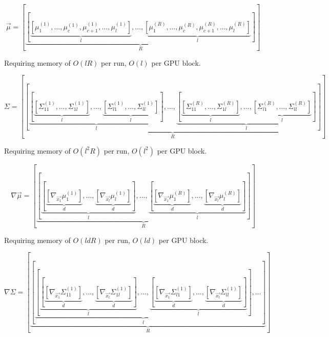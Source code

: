 \documentclass[index]{subfiles}
\begin{document}
\begin{equation}
    \vec{\mu} = \left[ \underbrace{\left[ \underbrace{\left[\mu_{1}^{(1)}, \ldots, \mu_{c}^{(1)}, \mu_{c+1}^{(1)}, \ldots, \mu_{l}^{(1)} \right]}_{l}, \ldots, \underbrace{\left[\mu_{1}^{(R)}, \ldots, \mu_{c}^{(R)}, \mu_{c+1}^{(R)}, \ldots, \mu_{l}^{(R)} \right]}_{l} \right]}_{R} \right]
\end{equation}

Requiring memory of $O(lR)$ per run, $O(l)$ per GPU block.

\begin{equation}
    \Sigma = \left[ \underbrace{ \left[ \underbrace{ \left[ \underbrace{ \left[ \Sigma_{11}^{(1)}, \ldots, \Sigma_{1l}^{(1)} \right]}_{l}, \ldots, \underbrace{ \left[ \Sigma_{l1}^{(1)}, \ldots, \Sigma_{ll}^{(1)} \right]}_{l} \right] }_{l}, \ldots, \underbrace{ \left[ \underbrace{ \left[ \Sigma_{11}^{(R)}, \ldots, \Sigma_{1l}^{(R)} \right]}_{l}, \ldots, \underbrace{ \left[ \Sigma_{l1}^{(R)}, \ldots, \Sigma_{ll}^{(R)} \right]}_{l} \right] }_{l}  \right]}_{R}\right]
\end{equation}

Requiring memory of $O(l^{2}R)$ per run, $O(l^{2})$ per GPU block.

\begin{equation}
    \nabla \vec{\mu} = \left[ \underbrace{ \left[ \underbrace{ \left[ \underbrace{ \left[ \nabla_{\vec{x_{1}}} \mu_{1}^{(1)} \right]}_{d} , \ldots, \underbrace{ \left[ \nabla_{\vec{x_{l}}} \mu_{l}^{(1)} \right]}_{d}\right]}_{l}, \ldots, \underbrace{ \left[ \underbrace{ \left[ \nabla_{\vec{x_{1}}} \mu_{1}^{(R)} \right]}_{d} , \ldots, \underbrace{ \left[ \nabla_{\vec{x_{l}}} \mu_{l}^{(R)} \right]}_{d}\right]}_{l} \right]}_{R} \right]
\end{equation}

Requiring memory of $O(ldR)$ per run, $O(ld)$ per GPU block.

\begin{equation}
    \nabla \Sigma = \left[ \underbrace{ \left[ \underbrace{ \left[ \underbrace{ \left[ \underbrace{ \left[ \nabla_{\vec{x_{1}}} \Sigma_{11}^{(1)} \right]}_{d} , \ldots, \underbrace{ \left[ \nabla_{\vec{x_{l}}} \Sigma_{1l}^{(1)} \right]}_{d}\right]}_{l}, \ldots, \underbrace{ \left[ \underbrace{ \left[ \nabla_{\vec{x_{1}}} \Sigma_{l1}^{(1)} \right]}_{d} , \ldots, \underbrace{ \left[ \nabla_{\vec{x_{l}}} \Sigma_{ll}^{(1)} \right]}_{d}\right]}_{l} \right] }_{l}, \ldots \right]}_{R} \right]
\end{equation}
\end{document}
